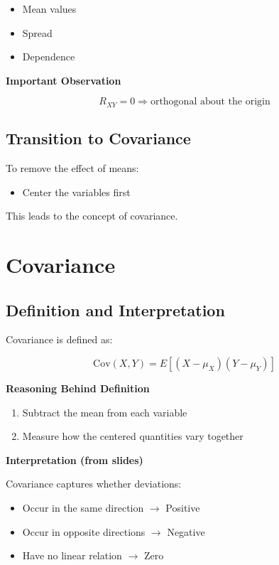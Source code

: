 \documentclass[12pt]{article}
\begin{document}
\begin{itemize}
\item Mean values
\item Spread
\item Dependence
\end{itemize}

\textbf{Important Observation}

\[
R_{XY} = 0 \Rightarrow \text{orthogonal about the origin}
\]

\subsection{Transition to Covariance}

To remove the effect of means:

\begin{itemize}
\item Center the variables first
\end{itemize}

This leads to the concept of covariance.

\section{Covariance}

\subsection{Definition and Interpretation}

Covariance is defined as:

\[
\text{Cov}(X, Y) = E[(X - \mu_X)(Y - \mu_Y)]
\]

\textbf{Reasoning Behind Definition}

\begin{enumerate}
\item Subtract the mean from each variable
\item Measure how the centered quantities vary together
\end{enumerate}

\textbf{Interpretation (from slides)}

Covariance captures whether deviations:

\begin{itemize}
\item Occur in the same direction $\rightarrow$ Positive
\item Occur in opposite directions $\rightarrow$ Negative
\item Have no linear relation $\rightarrow$ Zero
\end{itemize}
\end{document}

